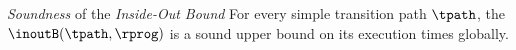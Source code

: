 \emph{Soundness} of the \emph{Inside-Out Bound}  
For every simple transition path $\tpath$, the $\inoutB(\tpath, \rprog)$
is a sound upper bound on its execution times globally.
